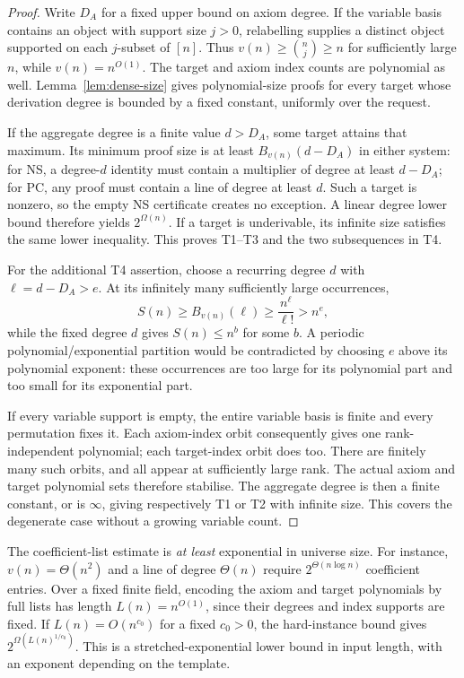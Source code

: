 \begin{proof}
Write $D_A$ for a fixed upper bound on axiom degree. If the variable
basis contains an object with support size $j>0$, relabelling supplies
a distinct object supported on each $j$-subset of $[n]$. Thus
$v(n)\ge\binom nj\ge n$ for sufficiently large $n$, while
$v(n)=n^{O(1)}$. The target and axiom index counts are polynomial as well.
Lemma~\ref{lem:dense-size} gives polynomial-size proofs for every target
whose derivation degree is bounded by a fixed constant, uniformly over
the request.

If the aggregate degree is a finite value $d>D_A$, some target attains
that maximum. Its minimum proof size is at least
$B_{v(n)}(d-D_A)$ in either system: for NS, a degree-$d$ identity must
contain a multiplier of degree at least $d-D_A$; for PC, any proof must
contain a line of degree at least $d$. Such a target is nonzero, so the
empty NS certificate creates no exception. A linear degree lower bound
therefore yields $2^{\Omega(n)}$. If a target is underivable, its infinite
size satisfies the same lower inequality. This proves T1--T3 and the two
subsequences in T4.

For the additional T4 assertion, choose a recurring degree $d$ with
$\ell=d-D_A>e$. At its infinitely many sufficiently large occurrences,
\[
                   S(n)\ge B_{v(n)}(\ell)
                        \ge\frac{n^{\ell}}{\ell!}>n^e,
\]
while the fixed degree $d$ gives $S(n)\le n^b$ for some $b$.
A periodic polynomial/exponential partition would be contradicted by
choosing $e$ above its polynomial exponent: these occurrences are too
large for its polynomial part and too small for its exponential part.

If every variable support is empty, the entire variable basis is finite
and every permutation fixes it. Each axiom-index orbit consequently
gives one rank-independent polynomial; each target-index orbit does too.
There are finitely many such orbits, and all appear at sufficiently
large rank. The actual axiom and target polynomial sets therefore
stabilise. The aggregate degree is then a finite constant, or is
$\infty$, giving respectively T1 or T2 with infinite size. This covers
the degenerate case without a growing variable count.
\end{proof}

The coefficient-list estimate is \emph{at least} exponential in universe
size. For instance, $v(n)=\Theta(n^2)$ and a line of degree $\Theta(n)$
require $2^{\Theta(n\log n)}$ coefficient entries. Over a fixed finite
field, encoding the axiom and target polynomials by full lists has length
$L(n)=n^{O(1)}$, since their degrees and index supports are fixed.
If $L(n)=O(n^{c_0})$ for a fixed $c_0>0$, the hard-instance bound gives
$2^{\Omega(L(n)^{1/c_0})}$. This is a stretched-exponential lower bound in
input length, with an exponent depending on the template.
